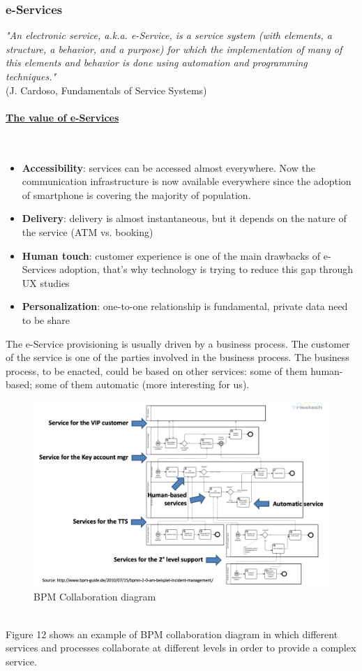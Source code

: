 \documentclass[10pt,a4paper]{article}
\newcommand{\myparagraph}[1]{\paragraph{\uline{#1}}\mbox{}\\[0.05in]}
\begin{document}
\subsubsection{e-Services}
\textit{"An electronic service, a.k.a. e-Service, is a service system (with elements, a structure, a behavior, and a purpose) for which the implementation of many of this elements and behavior is done using automation and programming techniques."} \\(J. Cardoso, Fundamentals of Service Systems)
\myparagraph{The value of e-Services}
\begin{itemize}
	\item \textbf{Accessibility}: services can be accessed almost everywhere. Now the communication infrastructure is now available everywhere since the adoption of smartphone is covering the majority of population.
	\item \textbf{Delivery}: delivery is almost instantaneous, but it depends on the nature of the service (ATM vs. booking)
	\item \textbf{Human touch}: customer experience is one of the main drawbacks of e-Services adoption, that's why technology is trying to reduce this gap through UX studies
	\item \textbf{Personalization}: one-to-one relationship is fundamental, private data need to be share
\end{itemize}
The e-Service provisioning is usually driven by a business process. The customer of the service is one of the parties involved in the business process. The business process, to be enacted, could be based on other services: some of them human-based; some of them automatic (more interesting for us).
\begin{figure}[ht!]
 \hfill \includegraphics[width=350pt]{images/business-process}\hspace*{\fill}
 \caption{BPM Collaboration diagram}
  \label{fig:business-process}
\end{figure} \\
Figure 12 shows an example of BPM collaboration diagram in which different services and processes collaborate at different levels in order to provide a complex service. 
\pagebreak
\end{document}
